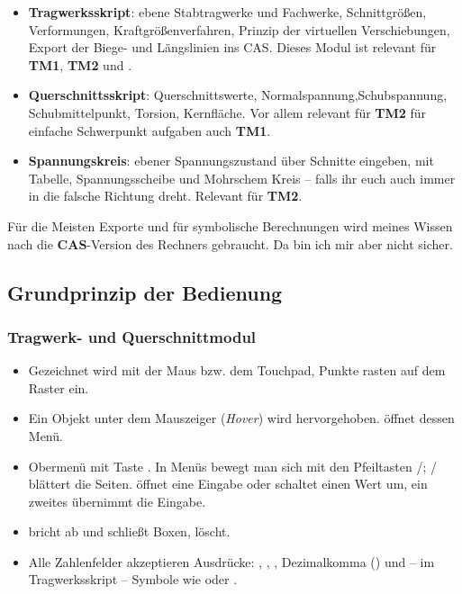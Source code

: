 \begin{itemize}
  \item \textbf{Tragwerksskript}: ebene Stabtragwerke und Fachwerke, Schnittgrößen,
        Verformungen, Kraftgrößenverfahren, Prinzip der virtuellen Verschiebungen, Export der Biege- und Längslinien ins CAS. Dieses Modul ist relevant für \textbf{TM1}, \textbf{TM2} und .
        
  \item \textbf{Querschnittsskript}: Querschnittswerte,
        Normalspannung,Schubspannung, Schubmittelpunkt, Torsion, Kernfläche. Vor allem relevant für \textbf{TM2} für einfache Schwerpunkt aufgaben auch \textbf{TM1}.

  \item \textbf{Spannungskreis}: ebener Spannungszustand über Schnitte eingeben, mit Tabelle,
        Spannungsscheibe und Mohrschem Kreis -- falls ihr euch auch immer in die falsche Richtung dreht. Relevant für \textbf{TM2}. 
\end{itemize}

Für die Meisten Exporte und für symbolische Berechnungen wird meines Wissen nach die
\textbf{CAS}-Version des Rechners gebraucht. Da bin ich mir aber nicht sicher.



\subsection{Grundprinzip der Bedienung}

\subsubsection{Tragwerk- und Querschnittmodul}

\begin{itemize}
  \item Gezeichnet wird mit der Maus bzw. dem Touchpad, Punkte rasten auf dem Raster ein.
  \item Ein Objekt unter dem Mauszeiger (\emph{Hover}) wird hervorgehoben.  öffnet
        dessen Menü.
  \item Obermenü mit Taste . In Menüs bewegt man sich mit den Pfeiltasten \taste{$\uparrow$}/\taste{$\downarrow$};
        \taste{$\leftarrow$}/\taste{$\rightarrow$} blättert die Seiten.  öffnet eine
        Eingabe oder schaltet einen Wert um, ein zweites  übernimmt die Eingabe.
  \item {} bricht ab und schließt Boxen,  löscht.
  \item Alle Zahlenfelder akzeptieren Ausdrücke: , , ,
        Dezimalkomma () und – im Tragwerksskript – Symbole wie  oder .
\end{itemize}

